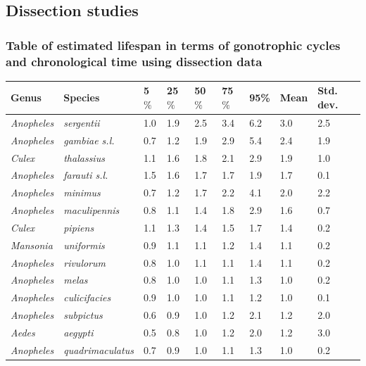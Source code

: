\documentclass[12pt]{article}
\begin{document}
{\subsection{Dissection studies}


\subsubsection{Table of estimated lifespan in terms of gonotrophic cycles and chronological time using dissection data}

\begin{table}[htbp]
\begin{tabular}{l|l|l|l|l|l|l|l|l}
	\textbf{Genus} & \textbf{Species} & \textbf{5$\%$} & \textbf{25$\%$} & \textbf{50$\%$} & \textbf{75$\%$} & \textbf{95\%} &  \textbf{Mean} & \textbf{Std. dev.}\\
		\hline
		\textit{Anopheles} & \textit{sergentii} & 1.0 & 1.9 & 2.5 & 3.4 & 6.2 & 3.0 & 2.5 \\
		\textit{Anopheles} & \textit{gambiae s.l.} & 0.7 & 1.2 & 1.9 & 2.9 & 5.4 & 2.4 & 1.9 \\
		\textit{Culex} & \textit{thalassius} & 1.1 & 1.6 & 1.8 & 2.1 & 2.9 & 1.9 & 1.0 \\
		\textit{Anopheles} & \textit{farauti s.l.} & 1.5 & 1.6 & 1.7 & 1.7 & 1.9 & 1.7 & 0.1 \\
		\textit{Anopheles} & \textit{minimus} & 0.7 & 1.2 & 1.7 & 2.2 & 4.1 & 2.0 & 2.2 \\
		\textit{Anopheles} & \textit{maculipennis} & 0.8 & 1.1 & 1.4 & 1.8 & 2.9 & 1.6 & 0.7 \\
		\textit{Culex} & \textit{pipiens} & 1.1 & 1.3 & 1.4 & 1.5 & 1.7 & 1.4 & 0.2 \\
		\textit{Mansonia} & \textit{uniformis} & 0.9 & 1.1 & 1.1 & 1.2 & 1.4 & 1.1 & 0.2 \\
		\textit{Anopheles} & \textit{rivulorum} & 0.8 & 1.0 & 1.1 & 1.1 & 1.4 & 1.1 & 0.2 \\
		\textit{Anopheles} & \textit{melas} & 0.8 & 1.0 & 1.0 & 1.1 & 1.3 & 1.0 & 0.2 \\
		\textit{Anopheles} & \textit{culicifacies} & 0.9 & 1.0 & 1.0 & 1.1 & 1.2 & 1.0 & 0.1 \\
		\textit{Anopheles} & \textit{subpictus} & 0.6 & 0.9 & 1.0 & 1.2 & 2.1 & 1.2 & 2.0 \\
		\textit{Aedes} & \textit{aegypti} & 0.5 & 0.8 & 1.0 & 1.2 & 2.0 & 1.2 & 3.0 \\
		\textit{Anopheles} & \textit{quadrimaculatus} & 0.7 & 0.9 & 1.0 & 1.1 & 1.3 & 1.0 & 0.2 \\

\end{tabular}
\end{table}}
\end{document}

